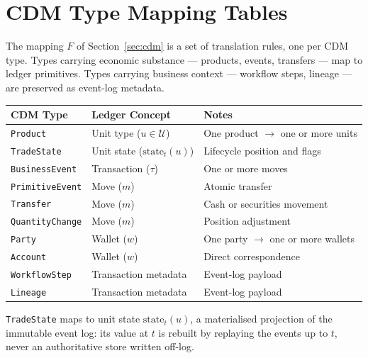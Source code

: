 \section{CDM Type Mapping Tables}
\label{sec:appA}\label{app:cdm-mapping}

The mapping $F$ of Section~\ref{sec:cdm} is a set of translation rules, one per CDM type. Types carrying economic substance --- products, events, transfers --- map to ledger primitives. Types carrying business context --- workflow steps, lineage --- are preserved as event-log metadata.

\begin{center}
\begin{tabular}{l l l}
\toprule
\textbf{CDM Type} & \textbf{Ledger Concept} & \textbf{Notes} \\
\midrule
\texttt{Product} & Unit type ($u \in \mathcal{U}$) & One product $\to$ one or more units \\
\texttt{TradeState} & Unit state ($\text{state}_t(u)$) & Lifecycle position and flags \\
\texttt{BusinessEvent} & Transaction ($\tau$) & One or more moves \\
\texttt{PrimitiveEvent} & Move ($m$) & Atomic transfer \\
\texttt{Transfer} & Move ($m$) & Cash or securities movement \\
\texttt{QuantityChange} & Move ($m$) & Position adjustment \\
\texttt{Party} & Wallet ($w$) & One party $\to$ one or more wallets \\
\texttt{Account} & Wallet ($w$) & Direct correspondence \\
\texttt{WorkflowStep} & Transaction metadata & Event-log payload \\
\texttt{Lineage} & Transaction metadata & Event-log payload \\
\bottomrule
\end{tabular}
\end{center}

\texttt{TradeState} maps to unit state $\text{state}_t(u)$, a materialised projection of the immutable event log: its value at $t$ is rebuilt by replaying the events up to $t$, never an authoritative store written off-log.
